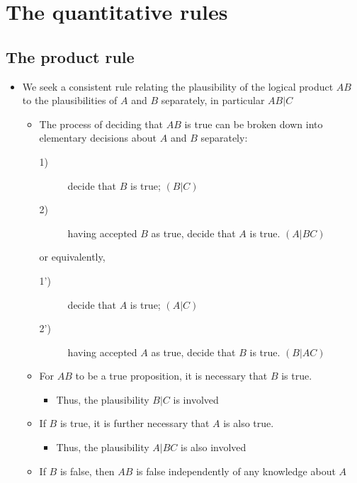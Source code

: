 \documentclass[9pt, letterpaper]{article}
\begin{document}
\section{The quantitative rules}

\subsection{The product rule}

\begin{itemize}
    \item{We seek a consistent rule relating the plausibility of the logical product $AB$ to the plausibilities of $A$ and $B$ separately, in particular $AB|C$}
        \begin{itemize}
            \item{The process of deciding that $AB$ is true can be broken down into elementary decisions about $A$ and $B$ separately:}
                \begin{description}
                    \item[1)] decide that $B$ is true; $\left(B|C\right)$
                    \item[2)] having accepted $B$ as true, decide that $A$ is true. $\left(A|BC\right)$
                \end{description}
                or equivalently,
                \begin{description}
                    \item[1')] decide that $A$ is true; $\left(A|C\right)$
                    \item[2')] having accepted $A$ as true, decide that $B$ is true. $\left(B|AC\right)$
                \end{description}
            \item{For $AB$ to be a true proposition, it is necessary that $B$ is true.}
                \begin{itemize}
                    \item{Thus, the plausibility $B|C$ is involved}
                \end{itemize}
            \item{If $B$ is true, it is further necessary that $A$ is also true.}
                \begin{itemize}
                    \item{Thus, the plausibility $A|BC$ is also involved}
                \end{itemize}
            \item{If $B$ is false, then $AB$ is false independently of any knowledge about $A$}
        \end{itemize}
\end{itemize}
\end{document}
